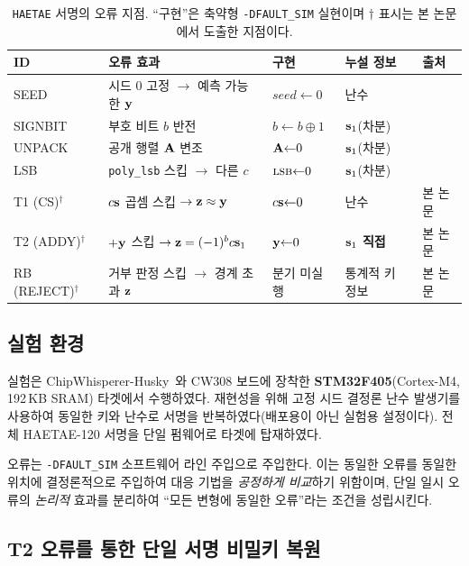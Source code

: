 \begin{table}[H]\centering
\caption{\texttt{HAETAE} 서명의 오류 지점. ``구현''은 축약형 \texttt{-DFAULT\_SIM} 실현이며 $\dagger$ 표시는
본 논문에서 도출한 지점이다.}
\label{tab:faultpoints}
\footnotesize
\begin{tabular}{@{}lllll@{}}
\toprule
ID & 오류 효과 & 구현 & 누설 정보 & 출처 \\
\midrule
SEED                 & 시드 0 고정 $\to$ 예측 가능한 $\mathbf{y}$ & $seed{\gets}0$ & 난수 & \cite{lee2026haetae} \\
SIGNBIT              & 부호 비트 $b$ 반전 & $b{\gets}b\oplus1$ & $\mathbf{s}_1$(차분) & \cite{lee2026haetae} \\
UNPACK               & 공개 행렬 $\mathbf{A}$ 변조 & $\mathbf{A}{\gets}0$ & $\mathbf{s}_1$(차분) & \cite{lee2026haetae} \\
LSB                  & \texttt{poly\_lsb} 스킵 $\to$ 다른 $c$ & $\textsc{lsb}{\gets}0$ & $\mathbf{s}_1$(차분) & \cite{lee2026haetae} \\
T1 (CS)$^\dagger$    & $c\mathbf{s}$ 곱셈 스킵 $\to \mathbf{z}\approx\mathbf{y}$ & $c\mathbf{s}{\gets}0$ & 난수 & 본 논문 \\
T2 (ADDY)$^\dagger$  & $+\mathbf{y}$ 스킵 $\to \mathbf{z}=(-1)^b c\mathbf{s}_1$ & $\mathbf{y}{\gets}0$ & \textbf{$\mathbf{s}_1$ 직접} & 본 논문 \\
RB (REJECT)$^\dagger$& 거부 판정 스킵 $\to$ 경계 초과 $\mathbf{z}$ & 분기 미실행 & 통계적 키 정보 & 본 논문 \\
\bottomrule
\end{tabular}
\end{table}

\subsection{실험 환경}
\label{subsec:setup}
실험은 ChipWhisperer-Husky~\cite{oflynn2014}와 CW308 보드에 장착한 \textbf{STM32F405}(Cortex-M4,
192\,KB SRAM) 타겟에서 수행하였다. 재현성을 위해 고정 시드 결정론
난수 발생기를 사용하여 동일한 키와 난수로 서명을 반복하였다(배포용이 아닌 실험용 설정이다). 전체
HAETAE-120 서명을 단일 펌웨어로 타겟에 탑재하였다.

오류는 \texttt{-DFAULT\_SIM} 소프트웨어 라인 주입으로 주입한다. 이는 동일한 오류를 동일한 위치에
결정론적으로 주입하여 대응 기법을 \emph{공정하게 비교}하기 위함이며, 단일 일시 오류의 \emph{논리적}
효과를 분리하여 ``모든 변형에 동일한 오류''라는 조건을 성립시킨다.

\subsection{T2 오류를 통한 단일 서명 비밀키 복원}
\label{subsec:key-recovery}


